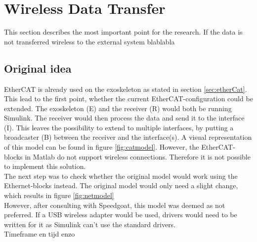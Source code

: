 \section{Wireless Data Transfer}
This section describes the most important point for the research. If the data is not transferred wireless to the external system blablabla

\subsection{Original idea}
EtherCAT is already used on the exoskeleton as stated in section \ref{sec:etherCat}. This lead to the first point, whether the current EtherCAT-configuration could be extended. The exoskeleton (E) and the receiver (R) would both be running Simulink. The receiver would then process the data and send it to the interface (I). This leaves the possibility to  extend to multiple interfaces, by putting a broadcaster (B) between the receiver and the interface(s). A visual representation of this model can be found in figure \ref{fig:catmodel}. However, the EtherCAT-blocks in Matlab \cite{web:ethercat} do not support wireless connections. Therefore it is not possible to implement this solution.\\
The next step was to check whether the original model would work using the Ethernet-blocks \cite{web:ethernet} instead. The original model would only need a slight change, which results in figure \ref{fig:netmodel}\\ 
However, after consulting with Speedgoat, this model was deemed as not preferred. If a USB wireless adapter would be used, drivers would need to be written for it as Simulink can't use the standard drivers.\\
Timeframe en tijd enzo\\

